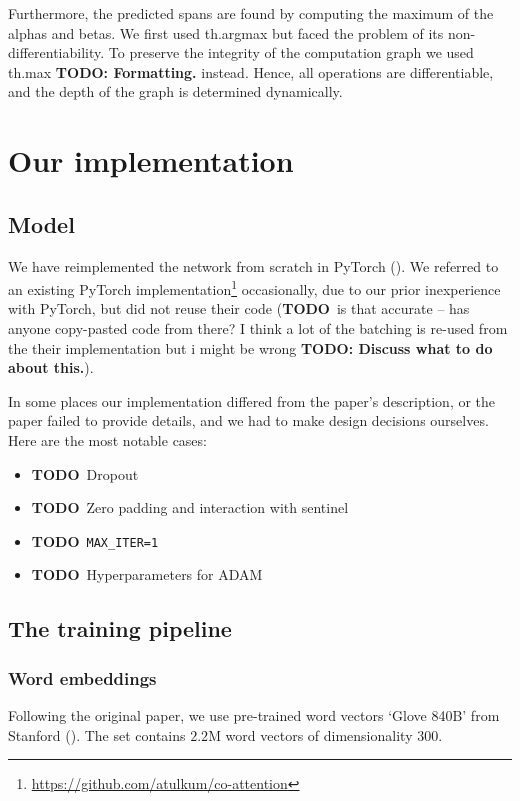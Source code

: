 \documentclass[a4paper, 10pt, conference]{article}
\newcommand{\ttt}{\texttt}
\newcommand{\TODO}{{\color{red}\textbf{TODO}}}
\newcommand{\TODOx}[1]{{\color{red}\textbf{TODO: #1}}}
\begin{document}
Furthermore, the predicted spans are found by computing the maximum of the alphas and betas. We first used th.argmax but faced the problem of its non-differentiability. To preserve the integrity of the computation graph we used th.max \TODOx{Formatting.} instead. Hence, all operations are differentiable, and the depth of the graph is determined dynamically.


\section{Our implementation}

\subsection{Model}

We have reimplemented the network from scratch in PyTorch (\cite{pytorch}). We referred to an existing PyTorch implementation\footnote{\url{https://github.com/atulkum/co-attention}} occasionally, due to our prior inexperience with PyTorch, but did not reuse their code (\TODO\ is that accurate -- has anyone copy-pasted code from there? I think a lot of the batching is re-used from the their implementation but i might be wrong \TODOx{ Discuss what to do about this.}).

In some places our implementation differed from the paper's description, or the paper failed to provide details, and we had to make design decisions ourselves. Here are the most notable cases:
\begin{itemize}
\item \TODO\ Dropout
\item \TODO\ Zero padding and interaction with sentinel
\item \TODO\ \ttt{MAX\_ITER=1}
\item \TODO\ Hyperparameters for ADAM
\end{itemize}


\subsection{The training pipeline}

\subsubsection{Word embeddings}
Following the original paper, we use pre-trained word vectors `Glove 840B' from Stanford (\cite{glove}). The set contains $2.2$M word vectors of dimensionality $300$.
\end{document}
